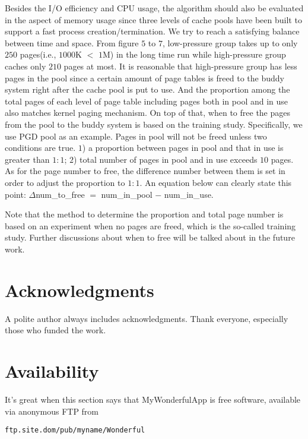 \documentclass[letterpaper,twocolumn,10pt]{article}
\begin{document}
Besides the I/O efficiency and CPU usage, the algorithm should also be evaluated in the aspect of memory usage since three levels of cache pools have been built to support a fast process creation/termination. We try to reach a satisfying balance between time and space. From figure $5$ to $7$, low-pressure group takes up to only $250$ pages(i.e., $1000$K $<$ $1$M) in the long time run while high-pressure group caches only $210$ pages at most. It is reasonable that high-pressure group has less pages in the pool since a certain amount of page tables is freed to the buddy system right after the cache pool is put to use. And the proportion among the total pages of each level of page table including pages both in pool and in use also matches kernel paging mechanism. On top of that, when to free the pages from the pool to the buddy system is based on the training study. Specifically, we use PGD pool as an example. Pages in pool will not be freed unless two conditions are true. $1$) a proportion between pages in pool and that in use is greater than $1:1$; $2$) total number of pages in pool and in use exceeds $10$ pages. As for the page number to free, the difference number between them is set in order to adjust the proportion to $1:1$. An equation below can clearly state this point: $\Delta$num\_to\_free $=$ num\_in\_pool $-$ num\_in\_use.

Note that the method to determine the proportion and total page number is based on an experiment when no pages are freed, which is the so-called training study. Further discussions about when to free will be talked about in the future work.


\section{Acknowledgments}

A polite author always includes acknowledgments.  Thank everyone,
especially those who funded the work.

\section{Availability}

It's great when this section says that MyWonderfulApp is free software,
available via anonymous FTP from

\begin{center}
{\tt ftp.site.dom/pub/myname/Wonderful}\\
\end{center}
\end{document}
